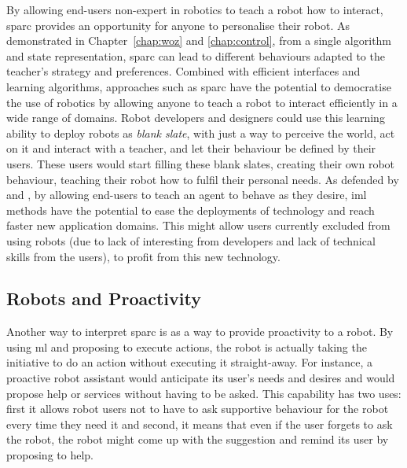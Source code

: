 By allowing end-users non-expert in robotics to teach a robot how to interact, \gls{sparc} provides an opportunity for anyone to personalise their robot. As demonstrated in Chapter~\ref{chap:woz} and \ref{chap:control}, from a single algorithm and state representation, \gls{sparc} can lead to different behaviours adapted to the teacher's strategy and preferences. Combined with efficient interfaces and learning algorithms, approaches such as \gls{sparc} have the potential to democratise the use of robotics by allowing anyone to teach a robot to interact efficiently in a wide range of domains. Robot developers and designers could use this learning ability to deploy robots as \emph{blank slate}, with just a way to perceive the world, act on it and interact with a teacher, and let their behaviour be defined by their users. These users would start filling these blank slates, creating their own robot behaviour, teaching their robot how to fulfil their personal needs. As defended by \cite{fails2003interactive} and \cite{amershi2014power}, by allowing end-users to teach an agent to behave as they desire, \gls{iml} methods have the potential to ease the deployments of technology and reach faster new application domains. This might allow users currently excluded from using robots (due to lack of interesting from developers and lack of technical skills from the users), to profit from this new technology.



\subsection{Robots and Proactivity}
Another way to interpret \gls{sparc} is as a way to provide proactivity to a robot. By using \gls{ml} and proposing to execute actions, the robot is actually taking the initiative to do an action without executing it straight-away. For instance, a proactive robot assistant would anticipate its user's needs and desires and would propose help or services without having to be asked. This capability has two uses: first it allows robot users not to have to ask supportive behaviour for the robot every time they need it and second, it means that even if the user forgets to ask the robot, the robot might come up with the suggestion and remind its user by proposing to help.

